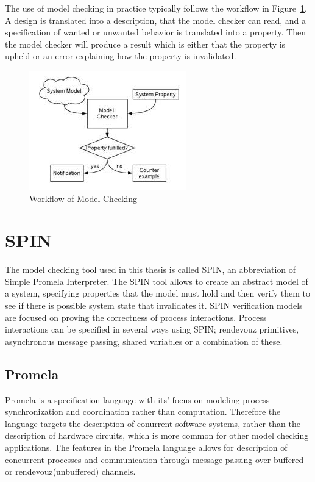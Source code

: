 
The use of model checking in practice typically follows the workflow in Figure~\ref{fig:mc_workflow}. A design is translated into a description, that the model checker can read, and a specification of wanted or unwanted behavior is translated into a property. Then the model checker will produce a result which is either that the property is upheld or an error explaining how the property is invalidated\cite{clarke1999model}. 

\begin{figure}[ht]
    \includegraphics[resolution=100]{include/figures/mc_workflow}
    \caption{Workflow of Model Checking}
    \label{fig:mc_workflow}
\end{figure}

\section{SPIN}

The model checking tool used in this thesis is called SPIN, an abbreviation of Simple Promela Interpreter. The SPIN tool allows to create an abstract model of a system, specifying properties that the model must hold and then verify them to see if there is possible system state that invalidates it. SPIN verification models are focused on proving the correctness of process interactions.\cite{holzmann1997model} Process interactions can be specified in several ways using SPIN; rendevouz primitives, asynchronous message passing, shared variables or a combination of these. 



\subsection{Promela}
Promela is a specification language with its' focus on modeling process synchronization and coordination rather than computation. Therefore the language targets the description of conurrent software systems, rather than the description of hardware circuits, which is more common for other model checking applications\cite{holzmann1997model}.
The features in the Promela language allows for description of concurrent processes and communication through message passing over buffered or rendevouz(unbuffered) channels. \\

